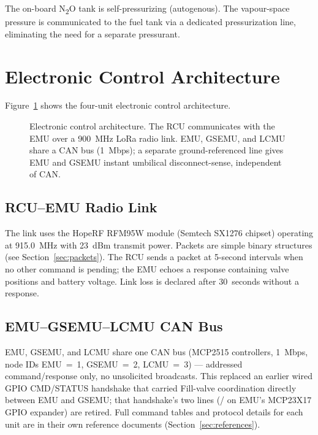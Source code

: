 \documentclass[11pt,letterpaper]{article}
\begin{document}
The on-board N\textsubscript{2}O tank is self-pressurizing (autogenous).  The
vapour-space pressure is communicated to the fuel tank via a dedicated
pressurization line, eliminating the need for a separate pressurant.

\section{Electronic Control Architecture}
\label{sec:architecture}

Figure~\ref{fig:control} shows the four-unit electronic control architecture.

\begin{figure}[H]
  \centering
  \resizebox{\textwidth}{!}{}
  \caption{Electronic control architecture. The RCU communicates with the EMU
           over a 900~MHz LoRa radio link. EMU, GSEMU, and LCMU share a CAN
           bus (1~Mbps); a separate ground-referenced line gives EMU and
           GSEMU instant umbilical disconnect-sense, independent of CAN.}
  \label{fig:control}
\end{figure}

\subsection{RCU--EMU Radio Link}

The link uses the HopeRF RFM95W module (Semtech SX1276 chipset) operating at
915.0~MHz with 23~dBm transmit power.  Packets are simple binary structures
(see Section~\ref{sec:packets}).  The RCU sends a  packet at
5-second intervals when no other command is pending; the EMU echoes a
 response containing valve positions and battery voltage.  Link
loss is declared after 30~seconds without a response.

\subsection{EMU--GSEMU--LCMU CAN Bus}

EMU, GSEMU, and LCMU share one CAN bus (MCP2515 controllers, 1~Mbps,
node IDs EMU~=~1, GSEMU~=~2, LCMU~=~3) --- addressed command/response only,
no unsolicited broadcasts. This replaced an earlier wired GPIO CMD/STATUS
handshake that carried Fill-valve coordination directly between EMU and
GSEMU; that handshake's two lines (/ on
EMU's MCP23X17 GPIO expander) are retired. Full command tables and protocol
details for each unit are in their own reference documents
(Section~\ref{sec:references}).
\end{document}
